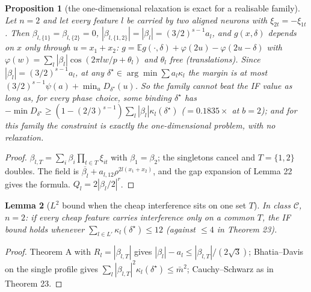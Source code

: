 \documentclass[11pt]{article}
\newtheorem{lemma}{Lemma}\newtheorem{proposition}[lemma]{Proposition}
\begin{document}
\begin{proposition}[the one-dimensional relaxation is exact for a realisable family]\label{exact}
Let $n=2$ and let every feature $l$ be carried by two aligned neurons with $\xi_{2t}=-\xi_{1t}$.  Then
$\beta_{l,\{1\}}=\beta_{l,\{2\}}=0$, $|\beta_{l,\{1,2\}}|=|\beta_l|=(3/2)^{s-1}a_l$, and $g(x,\delta)$ depends on $x$ only through
$u=x_1+x_2$: $g=\mathbb E g(\cdot,\delta)+\varphi(2u)-\varphi(2u-\delta)$ with $\varphi(w)=\sum_l|\beta_l|\cos(2\pi lw/p+\theta_l)$ and $\theta_l$ free
(translations).  Since $|\beta_l|=(3/2)^{s-1}a_l$, at any $\delta^\star\in\arg\min\sum a_l\kappa_l$ the margin is at most
$(3/2)^{s-1}\psi(a)+\min_uD_{\delta^\star}(u)$.  So the family cannot beat the IF value as long as, for every phase choice,
some binding $\delta^\star$ has $-\min D_{\delta^\star}\ge(1-(2/3)^{s-1})\sum_l|\beta_l|\kappa_l(\delta^\star)$ ($=0.1835\times$ at $b=2$); and for
this family the constraint is exactly the one-dimensional problem, with no relaxation.
\end{proposition}
\begin{proof}
$\beta_{l,T}=\sum_i\beta_i\prod_{t\in T}\xi_{it}$ with $\beta_1=\beta_2$; the singletons cancel and $T=\{1,2\}$ doubles.  The field is
$\overline{\beta_l}+a_{l,12}\rho^{2l(x_1+x_2)}$, and the gap expansion of Lemma 22 gives the formula.  $Q_l=2|\beta_l/2|^r$.
\end{proof}

\begin{lemma}[$L^2$ bound when the cheap interference sits on one set $T$]\label{l2}
In class $\mathcal C$, $n=2$: if every cheap feature carries interference only on a common $T$, the IF bound holds whenever
$\sum_{l\in L'}\kappa_l(\delta^\star)\le12$ (against $\le4$ in Theorem 23).
\end{lemma}
\begin{proof}
Theorem A with $R_l=|\beta_{l,T}|$ gives $|\beta_l|-a_l\le|\beta_{l,T}|/(2\sqrt3)$; Bhatia--Davis on the single profile gives
$\sum_l|\beta_{l,T}|^2\kappa_l(\delta^\star)\le\bar m^2$; Cauchy--Schwarz as in Theorem 23.
\end{proof}
\end{document}
